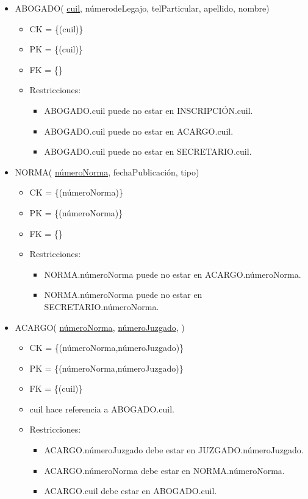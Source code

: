 \begin{itemize}
	
\item ABOGADO( \underline{cuil}, númerodeLegajo, telParticular, apellido, nombre)
	\begin{itemize}
		\item CK = \{(cuil)\}
		\item PK = \{(cuil)\}
		\item FK = \{\}
		\item Restricciones:
			\begin{itemize}
			\item ABOGADO.cuil puede no estar en INSCRIPCIÓN.cuil.
			\item ABOGADO.cuil puede no estar en ACARGO.cuil.
			\item ABOGADO.cuil puede no estar en SECRETARIO.cuil.
			\\
			\end{itemize}
	\end{itemize}

	
\item NORMA( \underline{númeroNorma}, fechaPublicación, tipo)
	\begin{itemize}
		\item CK = \{(númeroNorma)\}
		\item PK = \{(númeroNorma)\}
		\item FK = \{\}
		\item Restricciones:
			\begin{itemize}
			\item NORMA.númeroNorma puede no estar en ACARGO.númeroNorma.
			\item NORMA.númeroNorma puede no estar en SECRETARIO.númeroNorma.
			\\
			\end{itemize}
	\end{itemize}

	
\item ACARGO(  \underline{númeroNorma}, \underline{númeroJuzgado}, )
	\begin{itemize}
		\item CK = \{(númeroNorma,númeroJuzgado)\}
		\item PK = \{(númeroNorma,númeroJuzgado)\}
		\item FK = \{(cuil)\}
		\item cuil hace referencia a ABOGADO.cuil.
		\item Restricciones:
			\begin{itemize}
			\item ACARGO.númeroJuzgado debe estar en JUZGADO.númeroJuzgado.
			\item ACARGO.númeroNorma debe estar en NORMA.númeroNorma.
			\item ACARGO.cuil debe estar en ABOGADO.cuil.
			\\
			\end{itemize}
	\end{itemize}
	

\end{itemize}
